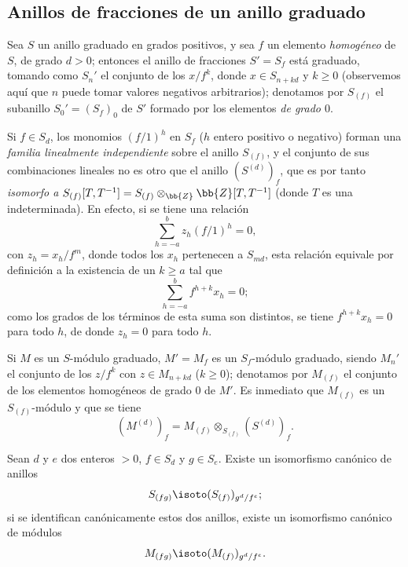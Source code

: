 \documentclass[oneside,10pt]{amsart}
\renewcommand{\geq}{\geqslant}
\newcommand{\oldpage}[2][]{\marginnote{\normalfont\footnotesize\textbf{#1}~|~#2}\ignorespaces}
\let\EGAOriginalLabel\label
\renewcommand{\label}[1]{\phantomsection\EGAOriginalLabel{#1}}
\begin{document}
\subsection{Anillos de fracciones de un anillo graduado}
\label{subsection:II.2.2}

\begin{env}[2.2.1]
\label{II.2.2.1}
Sea $S$ un anillo graduado en grados positivos, y sea $f$ un elemento \emph{homogéneo} de $S$, de grado $d>0$; entonces el anillo de fracciones $S'=S_f$ está graduado, tomando como $S_n'$ el conjunto de los $x/f^k$, donde $x\in S_{n+kd}$ y $k\geq0$ (observemos aquí que $n$ puede tomar valores negativos arbitrarios); denotamos por $S_{(f)}$ el subanillo $S_0'=(S_f)_0$ de $S'$ formado por los elementos \emph{de grado $0$}.

Si $f\in S_d$, los monomios $(f/1)^h$ en $S_f$ ($h$ entero positivo o negativo) forman una \emph{familia linealmente independiente} sobre el anillo $S_{(f)}$, y el conjunto de sus combinaciones lineales no es otro que
\oldpage[II]{24}
el anillo $(S^{(d)})_f$, que es por tanto \emph{isomorfo a $S_{(f)}[T,T^{-1}]=S_{(f)}\otimes_\bb{Z}\bb{Z}[T,T^{-1}]$} (donde $T$ es una indeterminada).
En efecto, si se tiene una relación
\[
  \sum_{h=-a}^{b}z_h(f/1)^h=0,
\]
con $z_h=x_h/f^m$, donde todos los $x_h$ pertenecen a $S_{md}$, esta relación equivale por definición a la existencia de un $k\geq a$ tal que
\[
  \sum_{h=-a}^{b}f^{h+k}x_h=0;
\]
como los grados de los términos de esta suma son distintos, se tiene $f^{h+k}x_h=0$ para todo $h$, de donde $z_h=0$ para todo $h$.

Si $M$ es un $S$-módulo graduado, $M'=M_f$ es un $S_f$-módulo graduado, siendo $M_n'$ el conjunto de los $z/f^k$ con $z\in M_{n+kd}$ ($k\geq0$); denotamos por $M_{(f)}$ el conjunto de los elementos homogéneos de grado $0$ de $M'$.
Es inmediato que $M_{(f)}$ es un $S_{(f)}$-módulo y que se tiene
\[
  (M^{(d)})_f=M_{(f)}\otimes_{S_{(f)}}(S^{(d)})_f.
\]
\end{env}

\begin{lemma}[2.2.2]
\label{II.2.2.2}
Sean $d$ y $e$ dos enteros $>0$, $f\in S_d$ y $g\in S_e$.
Existe un isomorfismo canónico de anillos
\[
  S_{(fg)}\isoto(S_{(f)})_{g^d/f^e};
\]
si se identifican canónicamente estos dos anillos, existe un isomorfismo canónico de módulos
\[
  M_{(fg)}\isoto(M_{(f)})_{g^d/f^e}.
\]
\end{lemma}
\end{document}
